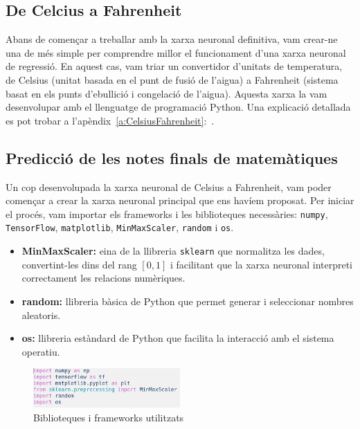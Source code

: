 \subsection{De Celcius a Fahrenheit}

Abans de començar a treballar amb la xarxa neuronal definitiva, vam crear-ne una de més simple per comprendre millor el funcionament d’una xarxa neuronal de regressió. En aquest cas, vam triar un convertidor d’unitats de temperatura, de Celsius (unitat basada en el punt de fusió de l’aigua) a Fahrenheit (sistema basat en els punts d’ebullició i congelació de l’aigua). Aquesta xarxa la vam desenvolupar amb el llenguatge de programació Python. Una explicació detallada es pot trobar a l’apèndix~\ref{a:CelsiusFahrenheit}:~.


\subsection{Predicció de les notes finals de matemàtiques}
Un cop desenvolupada la xarxa neuronal de Celsius a Fahrenheit, vam poder començar a crear la xarxa neuronal principal que ens havíem proposat. Per iniciar el procés, vam importar els frameworks i les biblioteques necessàries: \texttt{numpy}, \texttt{TensorFlow}, \texttt{matplotlib}, \texttt{MinMaxScaler}, \texttt{random} i \texttt{os}.

\begin{itemize}

\item \textbf{MinMaxScaler: } eina de la llibreria \texttt{sklearn} que normalitza les dades, convertint-les dins del rang $[0,1]$ i facilitant que la xarxa neuronal interpreti correctament les relacions numèriques.

\item \textbf{random: } llibreria bàsica de Python que permet generar i seleccionar nombres aleatoris.

\item \textbf{os: } llibreria estàndard de Python que facilita la interacció amb el sistema operatiu.

\end{itemize}

\begin{figure}[h!]
\centering
\includegraphics[width=0.5\textwidth]{./figures/21.png}
\caption{Biblioteques i frameworks utilitzats}
\end{figure}

